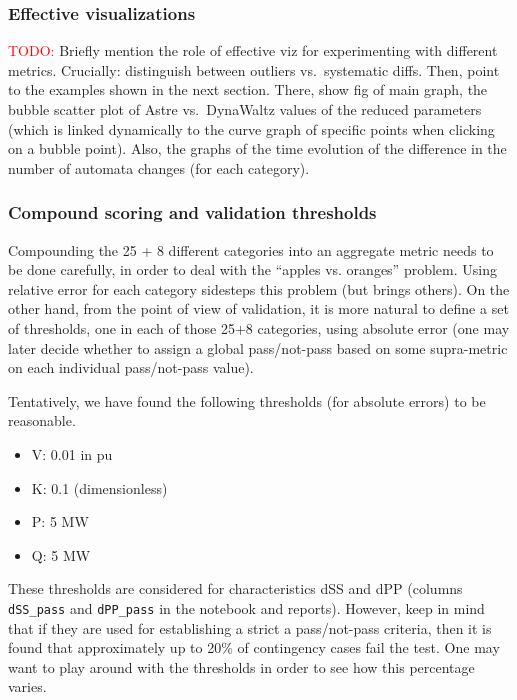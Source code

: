 \documentclass[conference]{IEEEtran}
\newcommand{\code}[1]{\texttt{#1}}
\begin{document}
\subsubsection{Effective visualizations}
\textcolor{red}{TODO:} Briefly mention the role of effective viz for
experimenting with different metrics. Crucially: distinguish between
outliers vs.\ systematic diffs.  Then, point to the examples shown in
the next section.  There, show fig of main graph, the bubble scatter
plot of Astre vs.\ DynaWaltz values of the reduced parameters (which
is linked dynamically to the curve graph of specific points when
clicking on a bubble point).  Also, the graphs of the time evolution
of the difference in the number of automata changes (for each
category).



\subsubsection{Compound scoring and validation thresholds}

Compounding the 25 + 8 different categories into an aggregate metric
needs to be done carefully, in order to deal with the ``apples vs. oranges''
problem. Using relative error for each category sidesteps this problem (but
brings others).  On the other hand, from the point of view of validation, it is
more natural to define a set of thresholds, one in each of those 25+8
categories, using absolute error (one may later decide whether to assign a
global pass/not-pass based on some supra-metric on each individual pass/not-pass
value).

Tentatively, we have found the following thresholds (for absolute
errors) to be reasonable.
\begin{itemize}
\item V: 0.01 in pu
\item K: 0.1 (dimensionless)
\item P: 5 MW
\item Q: 5 MW
\end{itemize}

These thresholds are considered for characteristics dSS and dPP
(columns \code{dSS\_pass} and \code{dPP\_pass} in the notebook and
reports).  However, keep in mind that if they are used for
establishing a strict a pass/not-pass criteria, then it is found that
approximately up to 20\% of contingency cases fail the test. One may
want to play around with the thresholds in order to see how this
percentage varies.
\end{document}
